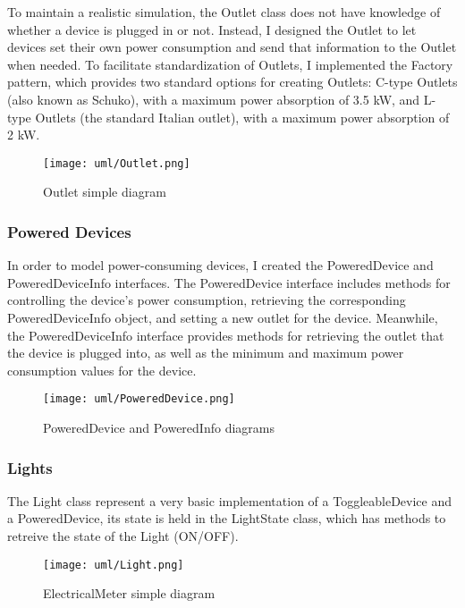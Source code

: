 To maintain a realistic simulation, the Outlet class does not have knowledge of whether a device is plugged in or not. 
Instead, I designed the Outlet to let devices set their own power consumption and send that information to the Outlet when needed. 
To facilitate standardization of Outlets, I implemented the Factory pattern, which provides two standard options for creating Outlets:
C-type Outlets (also known as Schuko), with a maximum power absorption of 3.5 kW, and L-type Outlets (the standard Italian outlet),
with a maximum power absorption of 2 kW.
\begin{figure}[H]
    \centering{}
    \texttt{[image: uml/Outlet.png]}
    \caption{Outlet simple diagram}
    \label{monticelli:uml:outlet}
\end{figure}
\subsubsection*{Powered Devices}
In order to model power-consuming devices, I created the PoweredDevice and PoweredDeviceInfo interfaces.\newline
The PoweredDevice interface includes methods for controlling the device's power consumption, retrieving the corresponding PoweredDeviceInfo object, 
and setting a new outlet for the device. Meanwhile, the PoweredDeviceInfo interface provides methods for retrieving the outlet that the device is plugged into, 
as well as the minimum and maximum power consumption values for the device.

\begin{figure}[H]
    \centering{}
    \texttt{[image: uml/PoweredDevice.png]}
    \caption{PoweredDevice and PoweredInfo diagrams}
    \label{monticelli:uml:poweredDevice}
\end{figure}
\subsubsection*{Lights}
The Light class represent a very basic implementation of a ToggleableDevice and a PoweredDevice, its state is held in the LightState class, which has methods to retreive the state of the Light (ON/OFF).

\begin{figure}[H]
    \centering{}
    \texttt{[image: uml/Light.png]}
    \caption{ElectricalMeter simple diagram}
    \label{monticelli:uml:light}
\end{figure}
